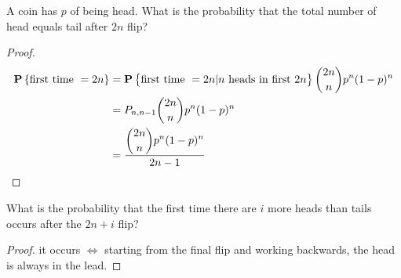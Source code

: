 \begin{example}
    A coin has $p$ of being head. What is the probability that the total number of head equals tail after $2n$ flip?    
\end{example}
\begin{proof}
    \begin{equation*}
        \begin{aligned}
            \mathop{\bf P\/}\displaystyle \left\{\text{first time } = 2n\right\} &= \mathop{\bf P\/}\displaystyle \left\{\text{first time } = 2n | n \text{ heads in first } 2n\right\} \binom{2n}{n} p^n (1-p)^n \\
            &= P_{n,n-1} \binom{2n}{n} p^n (1-p)^n \\
            &=  \frac{\displaystyle \binom{2n}{n} p^n (1-p)^n}{2n - 1}
        \end{aligned}
    \end{equation*}
\end{proof}

\begin{example}
    What is the probability that the first time there are $i$ more heads than tails occurs after the $2n+i$   flip?
\end{example}
\begin{proof}
    it occurs $\iff$ starting from the final flip and working backwards, the head is always in the lead.
\end{proof}





